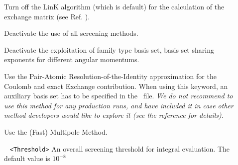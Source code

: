 \begin{description}
\item[] Turn off the LinK algorithm (which is default) for the calculation of the exchange matrix (see Ref. \cite{ochsenfeld:1663}).
\item[] Deactivate the use of all screening methods.
\item[] Deactivate the exploitation of family type basis set, basis set sharing exponents for different angular momentums.  
\item[] Use the Pair-Atomic Resolution-of-the-Identity
approximation \cite{PARI:2013} for the Coulomb and exact Exchange contribution.
When using this keyword, an auxiliary basis set has to be 
specified in the \mol\ file.\newline
\emph{We do not recommend to use this method for any production runs, and have included it 
in case other method developers would like to explore it (see the reference for details).}
\item[] Use the (Fast) Multipole Method.
\item[]
\verb| | \newline
\verb|<Threshold>|\newline
An overall screening threshold for integral evaluation. The default value is $10^{-8}$


\end{description}
